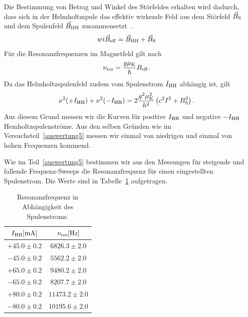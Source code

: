 \documentclass[paper=a4,
	fontsize=10pt,
	DIV=18,
	twocolumn,
	parskip=half
	]{scrartcl}
\numberwithin{equation}{section}    %
\begin{document}
Die Bestimmung von Betrag und Winkel des Störfeldes erhalten wird dadurch, dass sich in der Helmholtzspule das effektiv wirkende Feld aus dem Störfeld $\vec{B}_{\rm S}$ und dem Spulenfeld $\vec{B}_{\rm HH}$ zusammensetzt~\citep{anleitung}.
\begin{equation}wi
	\vec{B}_{\rm eff} = \vec{B}_{\rm HH} + \vec{B}_{\rm S}
\end{equation}
Für die Resonanzfrequenzen im Magnetfeld gilt nach~\citet{anleitung}
\begin{equation}
	\nu_{\rm res} = \frac{g\mu_{\rm K}}{h}B_{\rm eff}.
\end{equation}
Da das Helmholtzspulenfeld zudem vom Spulenstrom $I_{\rm HH}$ abhängig ist, gilt~\citep{anleitung}
\begin{equation}
	\nu^2(+I_{\rm HH}) + \nu^2(-I_{\rm HH}) = 2\frac{g^2\mu_{\rm K}^2}{h^2}\left( c^2I^2 + B^2_{\rm S} \right).
	\label{eq.stoerfeld}
\end{equation}
Aus diesem Grund messen wir die Kurven für positive $I_{\rm HH}$ und negative $-I_{\rm HH}$ Hemholtzspulenströme. Aus den selben Gründen wie im Versuchsteil~\ref{auswertung5} messen wir einmal von niedrigen und einmal von hohen Frequenzen kommend.

Wie im Teil~\ref{auswertung5} bestimmen wir aus den Messungen für steigende und fallende Frequenz-Sweeps die Resonanzfrequenz für einen eingestellten Spulenstrom. Die Werte sind in Tabelle~\ref{tab.helmholtzfrequenz} aufgetragen.

\begin{table}[htp]
	\begin{center}	
	\begin{tabular}{cc}
		\hline
		$I_{\rm HH}[\mathrm{mA}]$ & $\nu_{\rm res}[\mathrm{Hz}]$\\
		\hline	
		$+ 45.0 \pm 0.2$   & $ 6826.3 \pm 2.0$\\
		$- 45.0 \pm 0.2$   & $ 5562.2 \pm 2.0$\\
		$+ 65.0 \pm 0.2$   & $ 9480.2 \pm 2.0$\\
		$- 65.0 \pm 0.2$   & $ 8207.7 \pm 2.0$\\
		$+ 80.0 \pm 0.2$   & $11473.2 \pm 2.0$\\
		$- 80.0 \pm 0.2$   & $10195.6 \pm 2.0$\\
		\hline
	\end{tabular}	
	\caption{Resonanzfrequenz in Abhängigkeit des Spulenstroms.}
	\label{tab.helmholtzfrequenz}
	\end{center}
\end{table}
\end{document}
